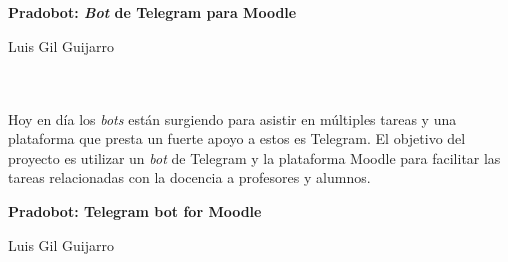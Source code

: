 \chapter*{}


%



\cleardoublepage
\thispagestyle{empty}

\begin{center}
{\large\bfseries Pradobot: \textit{Bot} de Telegram para Moodle}\\
\end{center}
\begin{center}
Luis Gil Guijarro\\
\end{center}

\\

\vspace{0.7cm}
\\

Hoy en día los \textit{bots} están surgiendo para asistir en múltiples tareas y una plataforma que presta un fuerte apoyo a estos es Telegram. El objetivo del proyecto es utilizar un \textit{bot} de Telegram y la plataforma Moodle para  facilitar las tareas relacionadas con la docencia a  profesores y alumnos.

\cleardoublepage


\thispagestyle{empty}


\begin{center}
{\large\bfseries Pradobot: Telegram bot for Moodle}\\
\end{center}
\begin{center}
Luis Gil Guijarro\\
\end{center}

\\

\vspace{0.7cm}
\\


